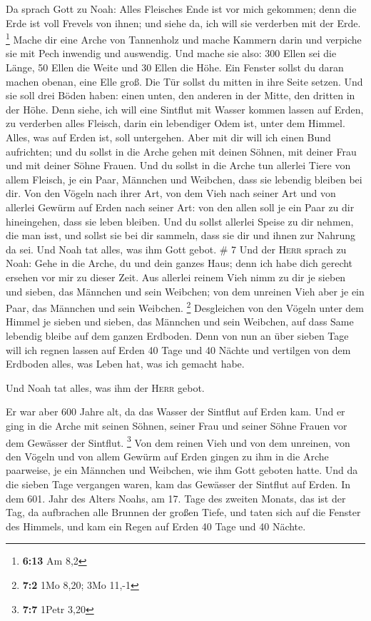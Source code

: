  Da sprach Gott zu Noah: Alles Fleisches Ende ist vor
mich gekommen; denn die Erde ist voll Frevels von ihnen; und siehe da,
ich will sie verderben mit der Erde. \footnote{\textbf{6:13} Am 8,2}
 Mache dir eine Arche von Tannenholz und mache Kammern
darin und verpiche sie mit Pech inwendig und auswendig. 
Und mache sie also: 300 Ellen sei die Länge, 50 Ellen die Weite und 30
Ellen die Höhe.  Ein Fenster sollst du daran machen
obenan, eine Elle groß. Die Tür sollst du mitten in ihre Seite setzen.
Und sie soll drei Böden haben: einen unten, den anderen in der Mitte,
den dritten in der Höhe.  Denn siehe, ich will eine
Sintflut mit Wasser kommen lassen auf Erden, zu verderben alles Fleisch,
darin ein lebendiger Odem ist, unter dem Himmel. Alles, was auf Erden
ist, soll untergehen.  Aber mit dir will ich einen Bund
aufrichten; und du sollst in die Arche gehen mit deinen Söhnen, mit
deiner Frau und mit deiner Söhne Frauen.  Und du sollst
in die Arche tun allerlei Tiere von allem Fleisch, je ein Paar, Männchen
und Weibchen, dass sie lebendig bleiben bei dir.  Von den
Vögeln nach ihrer Art, von dem Vieh nach seiner Art und von allerlei
Gewürm auf Erden nach seiner Art: von den allen soll je ein Paar zu dir
hineingehen, dass sie leben bleiben.  Und du sollst
allerlei Speise zu dir nehmen, die man isst, und sollst sie bei dir
sammeln, dass sie dir und ihnen zur Nahrung da sei.  Und
Noah tat alles, was ihm Gott gebot. \# 7  Und der
\textsc{Herr} sprach zu Noah: Gehe in die Arche, du und dein ganzes
Haus; denn ich habe dich gerecht ersehen vor mir zu dieser Zeit.
 Aus allerlei reinem Vieh nimm zu dir je sieben und
sieben, das Männchen und sein Weibchen; von dem unreinen Vieh aber je
ein Paar, das Männchen und sein Weibchen. \footnote{\textbf{7:2} 1Mo
  8,20; 3Mo 11,-1}  Desgleichen von den Vögeln unter dem
Himmel je sieben und sieben, das Männchen und sein Weibchen, auf dass
Same lebendig bleibe auf dem ganzen Erdboden.  Denn von
nun an über sieben Tage will ich regnen lassen auf Erden 40 Tage und 40
Nächte und vertilgen von dem Erdboden alles, was Leben hat, was ich
gemacht habe.

 Und Noah tat alles, was ihm der \textsc{Herr} gebot.

 Er war aber 600 Jahre alt, da das Wasser der Sintflut auf
Erden kam.  Und er ging in die Arche mit seinen Söhnen,
seiner Frau und seiner Söhne Frauen vor dem Gewässer der Sintflut.
\footnote{\textbf{7:7} 1Petr 3,20}  Von dem reinen Vieh
und von dem unreinen, von den Vögeln und von allem Gewürm auf Erden
 gingen zu ihm in die Arche paarweise, je ein Männchen und
Weibchen, wie ihm Gott geboten hatte.  Und da die sieben
Tage vergangen waren, kam das Gewässer der Sintflut auf Erden.
 In dem 601. Jahr des Alters Noahs, am 17. Tage des
zweiten Monats, das ist der Tag, da aufbrachen alle Brunnen der großen
Tiefe, und taten sich auf die Fenster des Himmels,  und
kam ein Regen auf Erden 40 Tage und 40 Nächte.

